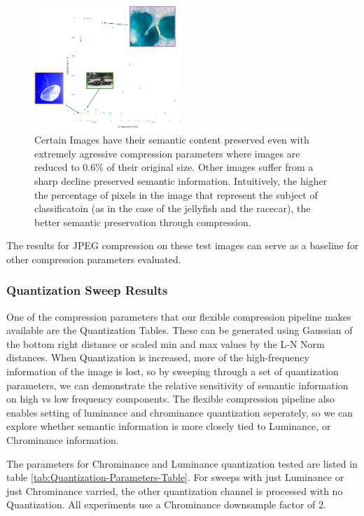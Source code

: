 \begin{figure}
    \includegraphics[width=0.5\textwidth]{assets/JPEG Baseline Compression with Examples}
    \caption{Certain Images have their semantic content preserved even with extremely agressive compression parameters where images are reduced to 0.6\% of their original size. Other images suffer from a sharp decline preserved semantic information. Intuitively, the higher the percentage of pixels in the image that represent the subject of classificatoin (as in the case of the jellyfish and the racecar), the better semantic preservation through compression.}
    \label{fig:Annotated JPEG Baseline}
\end{figure}

The results for JPEG compression on these test images can serve as a baseline for other compression parameters evaluated.

\subsubsection{Quantization Sweep Results}

One of the compression parameters that our flexible compression pipeline makes available are the Quantization Tables.
These can be generated using Gaussian of the bottom right distance or scaled min and max values by the L-N Norm distances.
When Quantization is increased, more of the high-frequency information of the image is lost, so by sweeping through a set of quantization parameters, we can demonstrate the relative sensitivity of semantic information on high vs low frequency components.
The flexible compression pipeline also enables setting of luminance and chrominance quantization seperately, so we can explore whether semantic information is more closely tied to Luminance, or Chrominance information.

The parameters for Chrominance and Luminance quantization tested are listed in table \ref{tab:Quantization-Parameters-Table}. For sweeps with just Luminance or just Chrominance varried, the other quantization channel is processed with no Quantization.
All experiments use a Chrominance downsample factor of 2.


